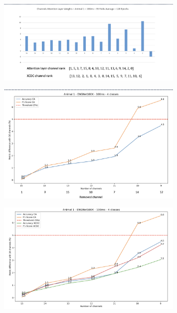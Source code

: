 \documentclass{Configuration_Files/PoliMi3i_thesis}
\begin{document}
\begin{figure}[h!]
    \centering
    \includegraphics[width=0.8\textwidth]{Results Matteo/figure10}
    \label{fig:figure1}
\end{figure}

\begin{figure}[h!]
    \centering
    \includegraphics[width=0.8\textwidth]{Results Matteo/figure11}
    \label{fig:figure1}
\end{figure}

\begin{figure}[h!]
    \centering
    \includegraphics[width=0.8\textwidth]{Results Matteo/figure12}
    \label{fig:figure1}
\end{figure}
\end{document}
